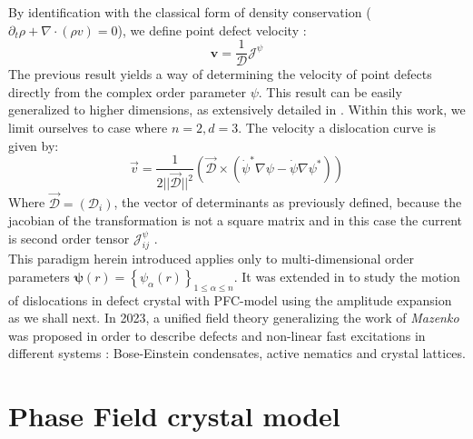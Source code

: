 \documentclass[11pt]{article}
\begin{document}
By identification with the classical form of density conservation ($\partial_t \rho + \nabla \cdot(\rho v) =0$), we define point defect velocity \parencite{mazenkoVortexVelocities1997} :
\begin{equation}
    \bm{v}= \frac{1}{\mathcal{D}} \bm{\mathcal{J}}^{\psi}
\end{equation}
The previous result yields a way of determining the velocity of point defects directly from the complex order parameter $\psi$. This result can be easily generalized to higher dimensions, as extensively detailed in \parencite{mazenkoVelocitydistribution1999}. Within this work, we limit ourselves to case where $n=2,d=3$. The velocity a dislocation curve is given by:
\begin{equation}
    \vec{v} = \frac{1}{2 ||\vec{\mathcal{D}}||^2}\left( \vec{\mathcal{D}} \times (\dot \psi^* \nabla \psi - \dot \psi \nabla \psi^*)\right)
\end{equation}
Where $\vec{\mathcal{D}} = (\mathcal{D}_i)$, the vector of determinants as previously defined, because the jacobian of the transformation is not a square matrix and in this case the current is second order tensor $\mathcal{J}_{ij}^\psi$ \parencite{mazenkoVelocitydistribution1999}.\\ 
This paradigm herein introduced applies only to multi-dimensional order parameters $\bm\psi(r)=\left\lbrace \psi_\alpha(r)\right\rbrace_{1\leq\alpha\leq n}$. It was extended in \parencite{skaugenDislocationdynamics2018}\parencite{skogvollphasefield2022} to study the motion of dislocations in defect crystal with PFC-model using the amplitude expansion as we shall next. In 2023, a unified field theory generalizing the work of \emph{Mazenko} was proposed  \parencite{skogvollunifiedfield2023} in order to describe defects and non-linear fast excitations in different systems : Bose-Einstein condensates, active nematics and crystal lattices.
\section{Phase Field crystal model}
\end{document}

